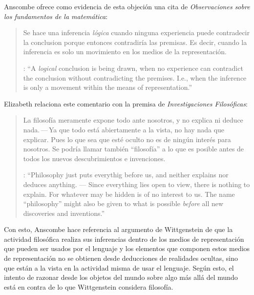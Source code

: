 Anscombe ofrece como evidencia de esta objeción una cita de \emph{Observaciones sobre los fundamentos de la matemática}: \blockquote[{\cite[VII, 25]{wittgenstein1956remmath}}: \enquote{A \emph{logical} conclusion is being drawn, when no experience can contradict the conclusion without contradicting the premises. I.e., when the inference is only a movement within the means of representation.}]{Se hace una inferencia \emph{lógica} cuando ninguna experiencia puede contradecir la conclusion porque entonces contradiría las premisas. Es decir, cuando la inferencia es solo un movimiento en los medios de la representación.} Elizabeth relaciona este comentario con la premisa de \emph{Investigaciones Filosóficas}: \blockquote[{\cite[\S126]{wittgenstein1953phiinv}}: \enquote{Philosophy just puts everythig before us, and neither explains nor deduces anything. --- Since everything lies open to view, there is nothing to explain. For whatever may be hidden is of no interest to us. The name ``philosophy'' might also be given to what is possible \emph{before} all new discoveries and inventions.}]{La filosofía meramente expone todo ante nosotros, y no explica ni deduce nada.\,---\,Ya que todo está abiertamente a la vista, no hay nada que explicar. Pues lo que sea que esté oculto no es de ningún interés para nosotros. Se podría llamar también ``filosofía'' a lo que es posible antes de todos los nuevos descubrimientos e invenciones.} Con esto, Anscombe hace referencia al argumento de Wittgenstein de que la actividad filosófica realiza sus inferencias dentro de los medios de representación que pueden ser usados por el lenguaje y los elementos que componen estos medios de representación no se obtienen desde deducciones de realidades ocultas, sino que están a la vista en la actividad misma de usar el lenguaje. Según esto, el intento de razonar desde los objetos del mundo sobre algo más allá del mundo está en contra de lo que Wittgenstein considera filosofía.



